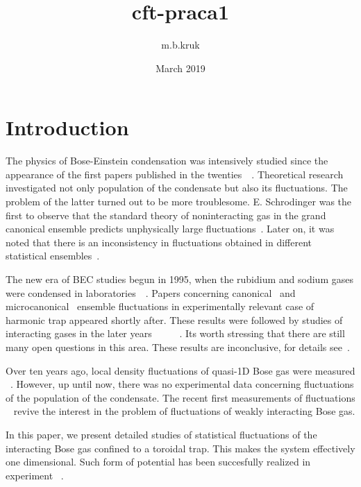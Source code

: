 \documentclass{article}
\title{cft-praca1}
\author{m.b.kruk }
\date{March 2019}
\begin{document}
\section{Introduction}
    The physics of Bose-Einstein condensation was intensively studied since the appearance of the first papers published in the twenties~\cite{bose1924plancks}~\cite{einstein1924quantentheorie}. Theoretical research investigated not only population of the condensate but also its fluctuations. The problem of the latter turned out to be more troublesome. E. Schrodinger was the first to observe that the standard theory of noninteracting gas in the grand canonical ensemble predicts unphysically large fluctuations~\cite{schrodinger1989statistical}. Later on, it was noted that there is an inconsistency in fluctuations obtained in different statistical ensembles~\cite{ziff1977ideal}. 
    
    The new era of BEC studies begun in 1995, when the rubidium and sodium gases were condensed in laboratories~\cite{davis1995bose}~\cite{anderson1995observation}. Papers concerning canonical~\cite{politzer1996condensate} and microcanonical~\cite{navez1997fourth} ensemble fluctuations in experimentally relevant case of harmonic trap appeared shortly after. 
    These results were followed by studies of interacting gases in the later years ~\cite{bienias2011statisticala}~\cite{bienias2011statistical}~\cite{PhysRevA.93.023636}~\cite{PhysRevLett.97.190402}~\cite{PhysRevLett.82.4376}. Its worth stressing that there are still many open questions in this area. These results are inconclusive, for details see~\cite{kristensen2019observation}.
    
    Over ten years ago, local density fluctuations of quasi-1D Bose gas were measured ~\cite{esteve2006observations}. However, up until now, there was no experimental data concerning fluctuations of the population of the condensate. The recent first measurements of fluctuations ~\cite{kristensen2019observation} revive the interest in the problem of fluctuations of weakly interacting Bose gas.
    
    In this paper, we present detailed studies of statistical fluctuations of the interacting Bose gas confined to a toroidal trap. This makes the system effectively one dimensional.
     Such form of potential has been succesfully realized in experiment ~\cite{meinert2015probing}.
     
\end{document}
